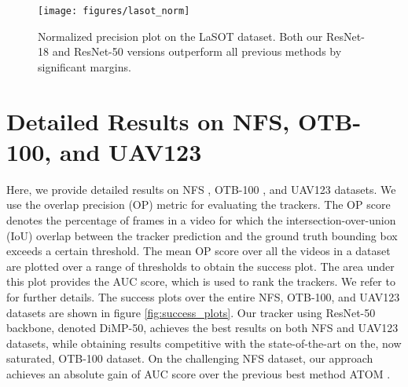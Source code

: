 \documentclass[10pt,twocolumn,letterpaper]{article}
\begin{document}
\begin{figure}[t]
	\centering \newcommand{\wid}{0.9\columnwidth}\texttt{[image: figures/lasot\_norm]}\vspace{-1.5mm}\caption{Normalized precision plot on the LaSOT dataset. Both our ResNet-18 and ResNet-50 versions outperform all previous methods by significant margins.
	}\label{fig:lasot_norm}\end{figure}

\begin{figure*}[t]
	\newcommand{\wid}{0.33\textwidth}\centering\vspace{-5mm}\vspace{1mm}\caption{Success plots on NFS (a), OTB-100 (b), and UAV123 (c) datasets. The area-under-the-curve (AUC) scores are shown in the legend. Our approach achieves the best scores on both the NFS and UAV123 datasets.}\label{fig:success_plots}
\end{figure*}

\section{Detailed Results on NFS, OTB-100, and UAV123}
\label{sec:detailed-res}

Here, we provide detailed results on NFS \cite{NfS}, OTB-100 \cite{OTB2015}, and UAV123 \cite{UAV123} datasets. We use the overlap precision (OP) metric for evaluating the trackers. The OP score denotes the percentage of frames in a video for which the intersection-over-union (IoU) overlap between the tracker prediction and the ground truth bounding box exceeds a certain threshold. The mean OP score over all the videos in a dataset are plotted over a range of thresholds  to obtain the success plot. The area under this plot provides the AUC score, which is used to rank the trackers. We refer to \cite{OTB2015} for further details. The success plots over the entire NFS, OTB-100, and UAV123 datasets are shown in figure \ref{fig:success_plots}. Our tracker using ResNet-50 backbone, denoted DiMP-50, achieves the best results on both NFS and UAV123 datasets, while obtaining results competitive with the state-of-the-art on the, now saturated, OTB-100 dataset. On the challenging NFS dataset, our approach achieves an absolute gain of  AUC score over the previous best method ATOM \cite{ATOM}.
\end{document}
